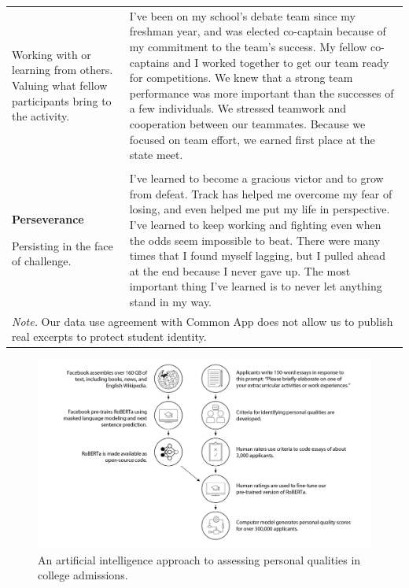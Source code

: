 \documentclass[11pt]{report}
\begin{document}
\begin{mainf}
\begin{table}
\begin{tabular}{  p{.275\linewidth}  p{.675\linewidth}}
Working with or learning from others. Valuing what fellow participants bring to the activity.                                                                                            & I’ve been on my school’s debate team since my freshman year, and was elected co-captain because of my commitment to the team’s success. My fellow co-captains and I worked together to get our team ready for competitions. We knew that a strong team performance was more important than the successes of a few individuals. We stressed teamwork and cooperation between our teammates. Because we focused on team effort, we earned first place at the state meet.             \\ \\
\textbf{Perseverance}

Persisting in the face of challenge.                                                                                                                                                      & I’ve learned to become a gracious victor and to grow from defeat. Track has helped me overcome my fear of losing, and even helped me put my life in perspective. I’ve learned to keep working and fighting even when the odds seem impossible to beat. There were many times that I found myself lagging, but I pulled ahead at the end because I never gave up. The most important thing I’ve learned is to never let anything stand in my way.     \\                         \hline    
\multicolumn{2}{l}{\textit{Note.} Our data use agreement with Common App does not allow us to publish real excerpts to protect student identity.}
\end{tabular}
\label{tab:pqs}

\end{table}

\begin{figure}
    \centering
    \includegraphics[width= \textwidth]{fig1_new2_scale.pdf}
    \caption{An artificial intelligence approach to assessing personal qualities in college admissions.}
    \label{fig:f1}
\end{figure}


\end{mainf}
\end{document}
